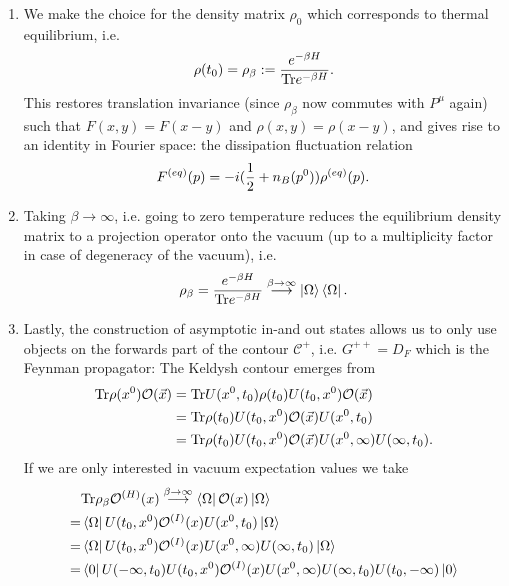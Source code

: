 \begin{enumerate}
\item We make the choice for the density matrix $\rho_0$ which corresponds to thermal equilibrium, i.e.
\begin{equation}
	\rho(t_0) = \rho_\beta := \frac{e^{-\beta H}}{\mathrm{Tr} e^{-\beta H}}.
\end{equation}
This restores translation invariance (since $\rho_\beta$ now commutes with $P^\mu$ again) such that $F(x,y) = F(x-y)$ and $\rho(x,y)=\rho(x-y)$, and gives rise to an identity in Fourier space: the dissipation fluctuation relation
\begin{equation}
	F^{(eq)}(p) = -i (\frac{1}{2} + n_B(p^0)) \rho^{(eq)} (p).
\end{equation}
\item Taking $\beta \rightarrow\infty$, i.e. going to zero temperature reduces the equilibrium density matrix to a projection operator onto the vacuum (up to a multiplicity factor in case of degeneracy of the vacuum), i.e.
\begin{equation}
	\rho_\beta = \frac{e^{-\beta H}}{\mathrm{Tr} e^{-\beta H}} \stackrel{\beta \rightarrow\infty}{\longrightarrow} \ket{\Omega}\bra{\Omega}.
\end{equation}
\item Lastly, the construction of asymptotic in-and out states allows us to only use objects on the forwards part of the contour $\mathcal{C}^+$, i.e. $G^{++}=D_F$ which is the Feynman propagator: The Keldysh contour emerges from
\begin{align*}
	\mathrm{Tr} \rho(x^0) \mathcal{O}(\vec{x}) &= \mathrm{Tr} U(x^0,t_0)\rho(t_0) U(t_0,x^0) \mathcal{O}(\vec{x})\\
	&= \mathrm{Tr} \rho(t_0) U(t_0,x^0) \mathcal{O} (\vec{x}) U(x^0,t_0) \\
	&= \mathrm{Tr} \rho(t_0) U(t_0,x^0) \mathcal{O}(\vec{x}) U(x^0,\infty) U(\infty,t_0).
\end{align*}
If we are only interested in vacuum expectation values we take
\begin{subequations}
\begin{align}
	&\tr \rho_\beta \mO^{(H)}(x) \stackrel{\beta \rightarrow\infty}{\longrightarrow} \bra{\Omega}\mO(x) \ket{\Omega}\nonumber\\
	=& \bra{\Omega} U(t_0,x^0) \mO^{(I)}(x) U(x^0,t_0) \ket{\Omega}\nonumber \\
	=& \bra{\Omega} U(t_0,x^0) \mO^{(I)}(x) U(x^0,\infty) U(\infty,t_0) \ket{\Omega}\nonumber\\
	=& \bra{0}U(-\infty,t_0) U(t_0,x^0) \mO^{(I)}(x) U(x^0,\infty) U(\infty,t_0) U(t_0,-\infty) \ket{0}\nonumber\\

\end{align}
\end{subequations}
\end{enumerate}
